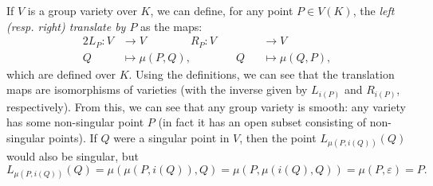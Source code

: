 If $V$ is a group variety over $K$, we can define, for any point $P\in V(K)$, the \emph{left (resp. right) translate by $P$} as the maps:
\begin{alignat*}{2}
	L_P:V&\rightarrow V \qquad\qquad R_P:V&&\rightarrow V\\
	Q&\mapsto \mu(P,Q),\qquad\qquad Q&&\mapsto \mu(Q,P),
\end{alignat*}
which are defined over $K$. Using the definitions, we can see that the translation maps are isomorphisms of varieties (with the inverse given by $L_{i(P)}$ and $R_{i(P)}$, respectively). From this, we can see that any group variety is smooth: any variety has some non-singular point $P$ (in fact it has an open subset consisting of non-singular points). If $Q$ were a singular point in $V$, then the point $L_{\mu(P,i(Q))}(Q)$ would also be singular, but
\begin{equation*}
	L_{\mu(P,i(Q))}(Q)=\mu(\mu(P,i(Q)),Q)=\mu(P,\mu(i(Q),Q))=\mu(P,\varepsilon)=P.
\end{equation*}

